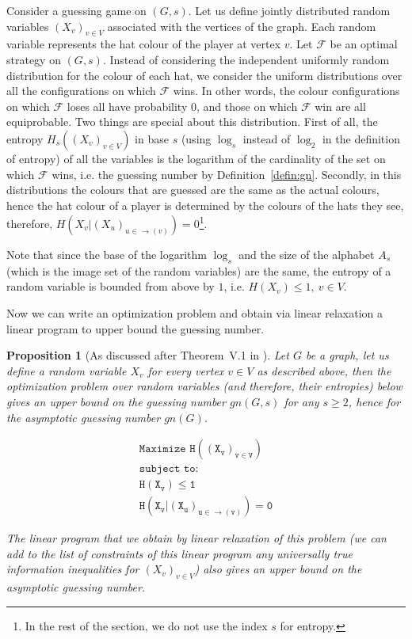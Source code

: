 \documentclass[11pt, a4paper]{kybernetika}
\newtheorem{proposition}[theorem]{Proposition}
\begin{document}
	Consider a guessing game on $(G,s)$. Let us define jointly distributed random variables $(X_v)_{v\in V}$ associated with the vertices of the graph. Each random variable represents the hat colour of the player at vertex $v$. Let $\mathcal{F}$ be an optimal strategy on $(G,s)$. Instead of considering the independent uniformly random distribution for the colour of each hat, we consider the uniform distributions over all the configurations on which $\mathcal{F}$ wins. In other words, the colour configurations on which $\mathcal{F}$ loses all have probability $0$, and those on which $\mathcal{F}$ win are all equiprobable. Two things are special about this distribution. First of all, the entropy $H_s((X_v)_{v\in V})$ in base $s$ (using $\log_s$ instead of $\log_2$ in the definition of entropy) of all the variables is the logarithm of the cardinality of the set on which $\mathcal{F}$ wins, i.e. the guessing number by Definition~\ref{defin:gn}. Secondly, in this distributions the colours that are guessed are the same as the actual colours, hence the hat colour of a player is determined by the colours of the hats they see, therefore, $H(X_v|(X_u)_{u\in\rightarrow(v)})=0$\footnote{In the rest of the section, we do not use the index $s$ for entropy.}.
	
	Note that since the base of the logarithm $\log_s$ and the size of the alphabet $A_s$ (which is the image set of the random variables) are the same, the entropy of a random variable is bounded from above by $1$, i.e. $H(X_v)\le1,\ v\in V$.
	
	Now we can write an optimization problem and obtain via linear relaxation a linear program to upper bound the guessing number.
	
	\begin{proposition}[As discussed after Theorem~V.1 in \cite{baber2016graph}]\label{prop:lp-gg}
		Let $G$ be a graph, let us define a random variable $X_v$ for every vertex $v\in V$ as described above, then the optimization problem over random variables (and therefore, their entropies) below gives an upper bound on the guessing number $gn(G,s)$ for any $s\ge2$, hence for the asymptotic guessing number $gn(G)$.
		
		$$
		\begin{array}{l}
			\texttt{Maximize }\mathtt{H((X_v)_{v\in V})}\\
			\texttt{subject to:}\\
			\mathtt{H(X_v)\le 1}\\
			\mathtt{H(X_v|(X_u)_{u\in\rightarrow(v)})=0}
		\end{array}
		$$
		
		The linear program that we obtain by linear relaxation of this problem (we can add to the list of constraints of this linear program any universally true information inequalities for $(X_v)_{v\in V}$) also gives an upper bound on the asymptotic guessing number.
	\end{proposition}
	
\end{document}
